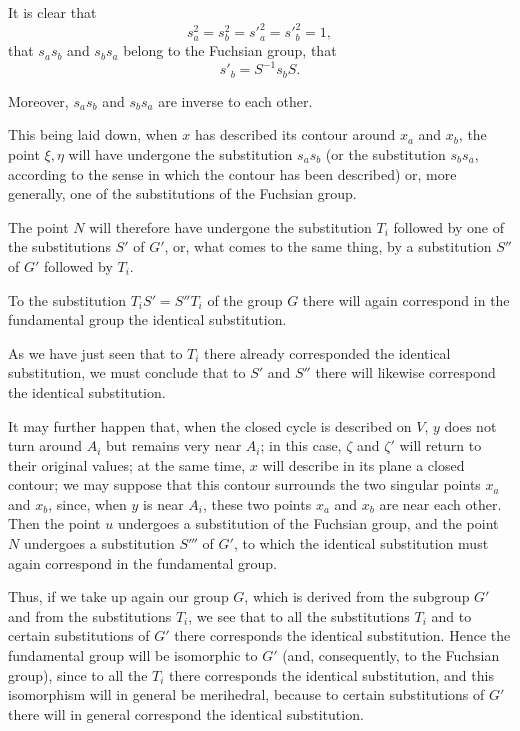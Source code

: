 \documentclass{article}
\begin{document}
It is clear that
\[ s^{2}_{a} = s^{2}_{b} = s'^{2}_{a} = s'^{2}_{b} = 1, \]
that $s_{a}s_{b}$ and $s_{b}s_{a}$ belong to the Fuchsian group, that
\[ s'_{b} = S^{-1} s_{b} S. \]

Moreover, $s_{a}s_{b}$ and $s_{b}s_{a}$ are inverse to each other.

This being laid down, when $x$ has described its contour around $x_{a}$ and $x_{b}$, the point $\xi, \eta$ will have undergone the substitution $s_{a}s_{b}$ (or the substitution $s_{b}s_{a}$, according to the sense in which the contour has been described) or, more generally, one of the substitutions of the Fuchsian group.

The point $N$ will therefore have undergone the substitution $T_{i}$ followed by one of the
substitutions $S'$ of $G'$, or, what comes to the same thing, by a substitution $S''$ of $G'$ followed by $T_{i}$.

To the substitution $T_{i}S' = S''T_{i}$ of the group $G$ there will again correspond in the fundamental group the identical substitution.

As we have just seen that to $T_{i}$ there already corresponded the identical substitution, we must conclude that to $S'$ and $S''$ there will likewise correspond the identical substitution.

It may further happen that, when the closed cycle is described on $V$, $y$ does not turn around $A_{i}$ but remains very near $A_{i}$; in this case, $\zeta$ and $\zeta'$ will return to their original values; at the same time, $x$ will describe in its plane a closed contour; we may suppose that this contour surrounds the two singular points $x_{a}$ and $x_{b}$, since, when $y$ is near $A_{i}$, these two points $x_{a}$ and $x_{b}$ are near each other. Then the point $u$ undergoes a substitution of the Fuchsian group, and the point $N$ undergoes a substitution $S'''$ of $G'$, to which the identical substitution must again correspond in the fundamental group.

Thus, if we take up again our group $G$, which is derived from the subgroup $G'$ and from the substitutions $T_{i}$, we see that to all the substitutions $T_{i}$ and to certain substitutions of $G'$ there corresponds the identical substitution. Hence the fundamental group will be isomorphic to $G'$ (and, consequently, to the Fuchsian group), since to all the $T_{i}$ there corresponds the identical substitution, and this isomorphism will in general be merihedral, because to certain substitutions of $G'$ there will in general correspond the identical substitution.
\end{document}
